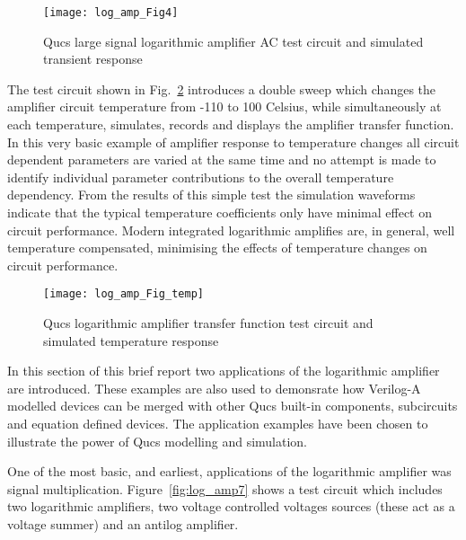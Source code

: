 \begin{figure} [here]
  \centering
  \texttt{[image: log\_amp\_Fig4]}
  \caption{Qucs large signal logarithmic amplifier AC test circuit and simulated transient response}
  \label{fig:log_amp4}  
\end{figure} 



The test circuit shown in Fig.~\ref{fig:log_amp_temp} introduces a
double sweep which changes the amplifier circuit temperature from -110
to 100 Celsius, while simultaneously at each temperature, simulates,
records and displays the amplifier transfer function. In this very
basic example of amplifier response to temperature changes all circuit
dependent parameters are varied at the same time and no attempt is
made to identify individual parameter contributions to the overall
temperature dependency. From the results of this simple test the
simulation waveforms indicate that the typical temperature
coefficients only have minimal effect on circuit performance. Modern
integrated logarithmic amplifies are, in general, well temperature
compensated, minimising the effects of temperature changes on circuit
performance.

\begin{figure} [here]
  \centering
  \texttt{[image: log\_amp\_Fig\_temp]}
  \caption{Qucs logarithmic amplifier transfer function test circuit and simulated temperature response}
  \label{fig:log_amp_temp}
\end{figure} 



In this section of this brief report two applications of the
logarithmic amplifier are introduced. These examples are also used to
demonsrate how Verilog-A modelled devices can be merged with other
Qucs built-in components, subcircuits and equation defined
devices. The application examples have been chosen to illustrate the
power of Qucs modelling and simulation.


One of the most basic, and earliest, applications of the logarithmic
amplifier was signal multiplication. Figure~\ref{fig:log_amp7} shows a
test circuit which includes two logarithmic amplifiers, two voltage
controlled voltages sources (these act as a voltage summer) and an
antilog amplifier.

